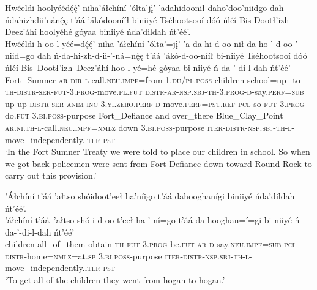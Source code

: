 \ea\label{ex:text3-1-1}
Hwéeldi hoolyéédę́ę́’ niha’áłchíní ’ólta’jį’ ’adahidoonił daho’doo’niidgo dah ńdahizhdii’nánę́ę t’áá ’ákódoonííł biniiyé Tséhootsooí dóó ńléí Bis Dootł’izh Deez’áhí hoolyéhé góyaa biniiyé ńda’dildah ńt’éé’.\\
\gll Hwééldi	h-oo-l-yéé=dę́ę́’	niha-’áłchíní	’ólta’=jį’	’a-da-hi-d-oo-nił	da-ho-’-d-oo-’-niid=go	dah	ń-da-hi-zh-d-ii-’-ná=nę́ę	t’áá	’ákó-d-oo-nííł	bi-niiyé	Tséhootsooí	dóó	ńléí	Bis~Dootł’izh~{Deez’áhí}	hoo-l-yé=hé	góyaa	bi-niiyé	ń-da-’-di-l-dah	ńt’éé’\\
     Fort\_Sumner	\textsc{ar}-\textsc{dir}-\textsc{l}-call.\textsc{neu}.\textsc{impf}=from	1.\textsc{du}/\textsc{pl}.\textsc{poss}-children	school=up\_to	\textsc{th}-\textsc{distr}-\textsc{ser}-\textsc{fut}-3.\textsc{prog}-move.\textsc{pl}.\textsc{fut}	\textsc{distr}-\textsc{ar}-\textsc{nsp}.\textsc{sbj}-\textsc{th}-3.\textsc{prog}-\textsc{d}-say.\textsc{perf}=\textsc{sub}	up	up-\textsc{distr}-\textsc{ser}-\textsc{anim}-\textsc{inc}-3.\textsc{yi}.\textsc{zero}.\textsc{perf}-\textsc{d}-move.\textsc{perf}=\textsc{pst}.\textsc{ref}	\textsc{pcl}	so-\textsc{fut}-3.\textsc{prog}-do.\textsc{fut}	3.\textsc{bi}.\textsc{poss}-purpose	Fort\_Defiance	and	over\_there	Blue\_Clay\_Point	\textsc{ar}.\textsc{ni}.\textsc{th}-\textsc{l}-call.\textsc{neu}.\textsc{impf}=\textsc{nmlz}	down	3.\textsc{bi}.\textsc{poss}-purpose	\textsc{iter}-\textsc{distr}-\textsc{nsp}.\textsc{sbj}-\textsc{th}-\textsc{l}-move\_independently.\textsc{iter}	\textsc{pst}\\
\glt `In the Fort Sumner Treaty we were told to place our children in school. So when we got back policemen were sent from Fort Defiance down toward Round Rock to carry out this provision.'
\z

\ea\label{ex:text3-1-2}
’Áłchíní t’áá ’ałtso shóidoot’eeł ha’níigo t’áá dahooghanígi biniiyé ńda’dildah ńt’éé’.\\
\gll ’áłchíní	t’áá~{’ałtso}	shó-i-d-oo-t’eeł	ha-’-ní=go	t’áá	da-hooghan=í=gi	bi-niiyé	ń-da-’-di-l-dah	ńt’éé’\\
     children	all\_of\_them	obtain-\textsc{th}-\textsc{fut}-3.\textsc{prog}-be.\textsc{fut}	\textsc{ar}-\textsc{d}-say.\textsc{neu}.\textsc{impf}=\textsc{sub}	\textsc{pcl}	\textsc{distr}-home=\textsc{nmlz}=at.\textsc{sp}	3.\textsc{bi}.\textsc{poss}-purpose	\textsc{iter}-\textsc{distr}-\textsc{nsp}.\textsc{sbj}-\textsc{th}-\textsc{l}-move\_independently.\textsc{iter}	\textsc{pst}\\
\glt `To get all of the children they went from hogan to hogan.'
\z

